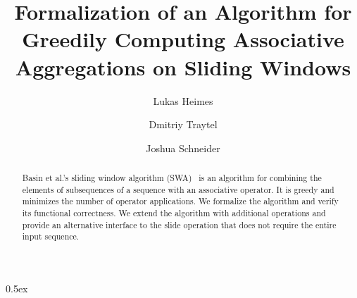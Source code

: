 \documentclass[10pt,a4paper]{article}
\begin{document}
\title{Formalization of an Algorithm for\\ Greedily Computing Associative Aggregations on Sliding Windows}
\author{Lukas Heimes \and Dmitriy Traytel \and Joshua Schneider}

\maketitle

\begin{abstract}
Basin et al.'s sliding window algorithm (SWA)~\cite{BASIN2015186} is an algorithm for combining
the elements of subsequences of a sequence with an associative operator. It is greedy and minimizes
the number of operator applications. We formalize the algorithm and verify its functional
correctness. We extend the algorithm with additional operations and provide an alternative interface
to the slide operation that does not require the entire input sequence.
\end{abstract}

\tableofcontents

\parindent 0pt\parskip 0.5ex





\end{document}
